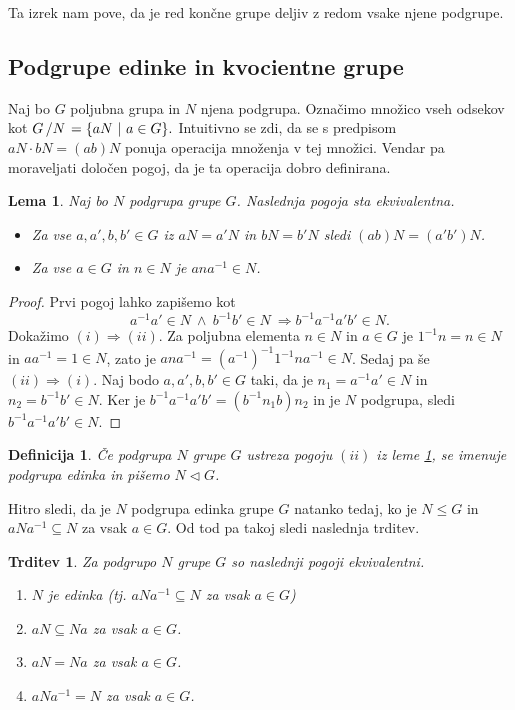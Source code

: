 \documentclass[10pt, a4paper]{article}
\newtheorem{trditev}[izr]{Trditev}
\newtheorem{defi}{Definicija}[section]
\newenvironment{noticeB}{%
  \tcolorbox[%
  notitle,
  empty,
  enhanced,  %
  breakable,
  coltext=black,
  colback=white, 
  fontupper=\rmfamily,
  noparskip,
  sharp corners,
  boxrule=-1pt,  %
  frame hidden,
  left=7pt,  %
  right=7pt,
  top=5pt,
  bottom=5pt,
  before skip=2.5ex plus 2pt,
  after skip=2.5ex plus 2pt,
  borderline west = {1.5pt}{-0.1pt}{blue!30!black}, %
  overlay unbroken and last={%
    \draw[color=black, line width=1.25pt]
    ($(frame.south west)+(1.pt, -0.1pt)$) -- ++(2em, 0);
  }
  ]}
{\endtcolorbox}
\newenvironment{definicija}{\begin{noticeB}\begin{defi}}{%
    \end{defi}\end{noticeB}}
\newtheorem{lema}[izr]{Lema}
\newenvironment{noticeC}{%
  \tcolorbox[%
  notitle,
  empty,
  enhanced,  %
  breakable,
  coltext=black, 
  fontupper=\rmfamily,
  noparskip,
  sharp corners,
  boxrule=-1pt,  %
  frame hidden,
  left=7pt,  %
  right=7pt,
  top=5pt,
  bottom=5pt,
  before skip=2.5ex plus 2pt,
  after skip=2.5ex plus 2pt,
  overlay unbroken and last={%
  },
  ]}
{\endtcolorbox}
\newenvironment{dokaz}%
  {\begin{noticeC}\begin{proof}}%
  {\end{proof}\end{noticeC}}
\newcommand{\quot}[2]{{\raisebox{0em}{$#1$}\left/\raisebox{0em}{$#2$}\right.}}
\begin{document}
Ta izrek nam pove, da je red končne grupe deljiv z redom vsake njene podgrupe.

\subsection{Podgrupe edinke in kvocientne grupe}

Naj bo $G$ poljubna grupa in $N$ njena podgrupa.
Označimo množico vseh odsekov kot $\quot{G}{N} = \{aN\ |\ a \in G\}.$
Intuitivno se zdi, da se s predpisom $aN \cdot bN = (ab) N$ ponuja operacija množenja
v tej množici. Vendar pa moraveljati določen pogoj, da je ta operacija dobro definirana.

\begin{lema}\label{lem:1}
  Naj bo $N$ podgrupa grupe $G$. Naslednja pogoja sta ekvivalentna.
  \begin{itemize}
    \item Za vse $a, a', b, b' \in G$ iz $aN = a'N$ in $bN = b'N$ sledi $(ab) N = (a'b') N$.
    \item Za vse $a \in G$ in $n \in N$ je $a n a^{-1} \in N$.
  \end{itemize}
\end{lema}

\begin{dokaz}
  Prvi pogoj lahko zapišemo kot 
  $$a^{-1}a' \in N\ \land\ b^{-1} b' \in N\ \Rightarrow b^{-1} a^{-1} a'b' \in N.$$
  Dokažimo $(i) \Rightarrow (ii)$. Za poljubna elementa $n \in N$ in $a \in G$
  je $1^{-1}n = n \in N$ in $a a^{-1} = 1 \in N$, zato je $a n a^{-1} = (a^{-1})^{-1} 1^{-1} n a^{-1} \in N$.
  Sedaj pa še $(ii) \Rightarrow (i)$. Naj bodo $a, a', b, b' \in G$ taki, 
  da je $n_1 = a^{-1}a' \in N$ in $n_2 = b^{-1} b' \in N$.
  Ker je $b^{-1} a^{-1} a' b' = (b^{-1} n_1 b) n_2$ in je $N$ podgrupa,
  sledi $b^{-1} a^{-1} a'b' \in N$.
\end{dokaz}

\begin{definicija}
  Če podgrupa $N$ grupe $G$ ustreza pogoju $(ii)$ iz leme \ref{lem:1},
  se imenuje podgrupa edinka in pišemo $N \lhd G$.
\end{definicija}

Hitro sledi, da je $N$ podgrupa edinka grupe $G$ natanko tedaj, ko je $N \leq G$ in $a N a^{-1} \subseteq N$
za vsak $a \in G$. Od tod pa takoj sledi naslednja trditev.

\begin{trditev}\label{trd:1}
  Za podgrupo $N$ grupe $G$ so naslednji pogoji ekvivalentni.
  \begin{enumerate}
    \item $N$ je edinka (tj. $a N a^{-1} \subseteq N$ za vsak $a \in G$)
    \item $aN \subseteq Na$ za vsak $a \in G$.
    \item $aN = N a$ za vsak $a \in G$.
    \item $a N a^{-1} = N$ za vsak $a \in G$.
  \end{enumerate}
\end{trditev}
\end{document}
